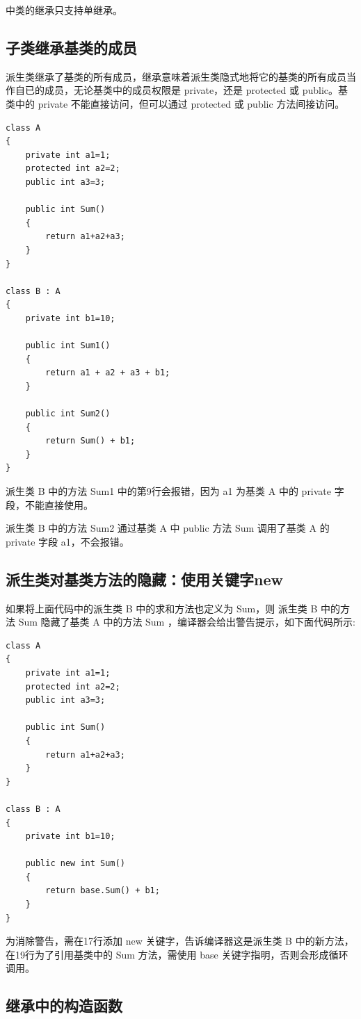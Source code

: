 \cs 中类的继承只支持单继承。

\subsection{子类继承基类的成员}

派生类继承了基类的所有成员，继承意味着派生类隐式地将它的基类的所有成员当作自已的成员，无论基类中的成员权限是 private，还是 protected 或 public。基类中的 private 不能直接访问，但可以通过 protected 或 public 方法间接访问。

\begin{lstlisting}
class A
{
	private int a1=1;
	protected int a2=2;
	public int a3=3;
		
	public int Sum()
	{
		return a1+a2+a3;
	}
}
	
class B : A
{
	private int b1=10;
	
	public int Sum1()
	{
		return a1 + a2 + a3 + b1; 
	}
	
	public int Sum2()
	{
		return Sum() + b1; 
	}
}
\end{lstlisting}

派生类 B 中的方法 Sum1 中的第9行会报错，因为 a1 为基类 A 中的 private 字段，不能直接使用。

派生类 B 中的方法 Sum2 通过基类 A 中 public 方法 Sum 调用了基类 A 的 private 字段 a1，不会报错。


\subsection{派生类对基类方法的隐藏：使用关键字new}

如果将上面代码中的派生类 B 中的求和方法也定义为 Sum，则 派生类 B 中的方法 Sum 隐藏了基类 A 中的方法 Sum ，编译器会给出警告提示，如下面代码所示:

\begin{lstlisting}
class A
{
	private int a1=1;
	protected int a2=2;
	public int a3=3;
	
	public int Sum()
	{
		return a1+a2+a3;
	}
}

class B : A
{
	private int b1=10;	
	
	public new int Sum()
	{
		return base.Sum() + b1; 
	}
}
\end{lstlisting}

为消除警告，需在17行添加 new 关键字，告诉编译器这是派生类 B 中的新方法，在19行为了引用基类中的 Sum 方法，需使用 base 关键字指明，否则会形成循环调用。


\subsection{继承中的构造函数}

